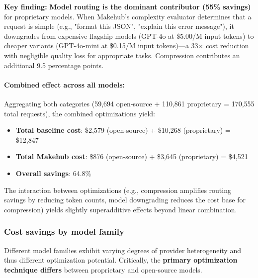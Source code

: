 \documentclass[english]{article}
\begin{document}
\medskip

\noindent\textbf{Key finding:} \textbf{Model routing is the dominant contributor (55\% savings)} for proprietary models. When Makehub's complexity evaluator determines that a request is simple (e.g., "format this JSON", "explain this error message"), it downgrades from expensive flagship models (GPT-4o at \$5.00/M input tokens) to cheaper variants (GPT-4o-mini at \$0.15/M input tokens)—a 33× cost reduction with negligible quality loss for appropriate tasks. Compression contributes an additional 9.5 percentage points.

\paragraph{Combined effect across all models:}

Aggregating both categories (59,694 open-source + 110,861 proprietary = 170,555 total requests), the combined optimizations yield:

\begin{itemize}
\item \textbf{Total baseline cost}: \$2,579 (open-source) + \$10,268 (proprietary) = \$12,847
\item \textbf{Total Makehub cost}: \$876 (open-source) + \$3,645 (proprietary) = \$4,521
\item \textbf{Overall savings}: 64.8\%
\end{itemize}

The interaction between optimizations (e.g., compression amplifies routing savings by reducing token counts, model downgrading reduces the cost base for compression) yields slightly superadditive effects beyond linear combination.

\subsubsection{Cost savings by model family}

Different model families exhibit varying degrees of provider heterogeneity and thus different optimization potential. Critically, the \textbf{primary optimization technique differs} between proprietary and open-source models.
\end{document}
